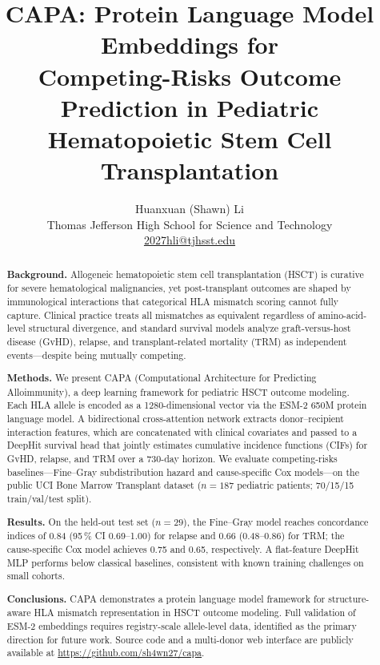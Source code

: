 \documentclass[11pt,letterpaper]{article}
\title{\textbf{CAPA: Protein Language Model Embeddings for\\
Competing-Risks Outcome Prediction in Pediatric\\
Hematopoietic Stem Cell Transplantation}}
\author{Huanxuan (Shawn) Li\\
\small Thomas Jefferson High School for Science and Technology\\
\small \href{mailto:2027hli@tjhsst.edu}{2027hli@tjhsst.edu}}
\date{}
\begin{document}
\maketitle


\begin{abstract}

\noindent\textbf{Background.}
Allogeneic hematopoietic stem cell transplantation (HSCT) is curative for
severe hematological malignancies, yet post-transplant outcomes are shaped by
immunological interactions that categorical HLA mismatch scoring cannot fully
capture.  Clinical practice treats all mismatches as equivalent regardless of
amino-acid-level structural divergence, and standard survival models analyze
graft-versus-host disease (GvHD), relapse, and transplant-related mortality
(TRM) as independent events---despite being mutually competing.

\medskip
\noindent\textbf{Methods.}
We present CAPA (Computational Architecture for Predicting Alloimmunity), a
deep learning framework for pediatric HSCT outcome modeling.  Each HLA allele
is encoded as a 1280-dimensional vector via the ESM-2 650M protein language
model.  A bidirectional cross-attention network extracts donor--recipient
interaction features, which are concatenated with clinical covariates and
passed to a DeepHit survival head that jointly estimates cumulative incidence
functions (CIFs) for GvHD, relapse, and TRM over a 730-day horizon.
We evaluate competing-risks baselines---Fine--Gray subdistribution hazard and
cause-specific Cox models---on the public UCI Bone Marrow Transplant dataset
($n=187$ pediatric patients; 70/15/15 train/val/test split).

\medskip
\noindent\textbf{Results.}
On the held-out test set ($n=29$), the Fine--Gray model reaches concordance
indices of 0.84 (95\,\% CI 0.69--1.00) for relapse and 0.66 (0.48--0.86) for
TRM; the cause-specific Cox model achieves 0.75 and 0.65, respectively.  A
flat-feature DeepHit MLP performs below classical baselines, consistent with
known training challenges on small cohorts.

\medskip
\noindent\textbf{Conclusions.}
CAPA demonstrates a protein language model framework for structure-aware HLA
mismatch representation in HSCT outcome modeling.  Full validation of ESM-2
embeddings requires registry-scale allele-level data, identified as the primary
direction for future work.  Source code and a multi-donor web interface are
publicly available at \url{https://github.com/sh4wn27/capa}.

\end{abstract}
\end{document}
